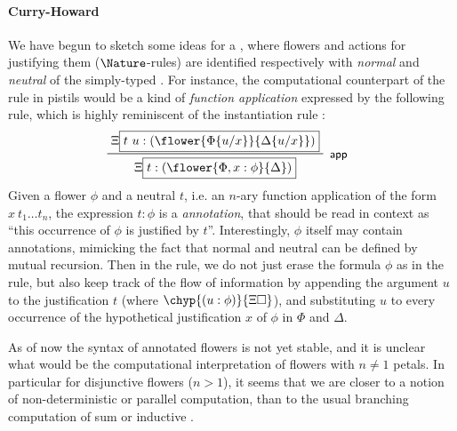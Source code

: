 \paragraph{Curry-Howard}

We have begun to sketch some ideas for a , where
flowers and \Proof actions for justifying them ($\Nature$-rules) are identified
respectively with \emph{normal} and \emph{neutral}  of the simply-typed
. For instance, the computational counterpart of the rule
 in pistils would be a kind of \emph{function application}
expressed by the following  rule, which is highly reminiscent of the
instantiation rule :
$$
\R[\rsf{app}]
  {\Xi\select{t~u : (\flower{\subst{\Phi}{u}{x}}{\subst{\Delta}{u}{x}})}}
  {\Xi\select{t : (\flower{\Phi, x : \phi}{\Delta})}}
$$
Given a flower $\phi$ and a neutral  $t$, i.e. an $n$-ary function
application of the form $x~t_1 \ldots t_n$, the expression $t : \phi$ is a
\emph{ annotation}, that should be read in context as ``this occurrence of
$\phi$ is justified by $t$''. Interestingly, $\phi$ itself may contain 
annotations, mimicking the fact that normal and neutral  can be defined by
mutual recursion. Then in the  rule, we do not just erase the formula
$\phi$ as in the  rule, but also keep track of the flow of
information by appending the argument $u$ to the justification $t$ (where
$\chyp{(u : \phi)}{\Xi\hole}$), and substituting $u$ to every occurrence of the
hypothetical justification $x$ of $\phi$ in $\Phi$ and $\Delta$.

As of now the syntax of annotated flowers is not yet stable, and it is unclear
what would be the computational interpretation of flowers with $n \not= 1$
petals. In particular for disjunctive flowers ($n > 1$), it seems that we are
closer to a notion of non-deterministic or parallel computation, than to the
usual branching computation of sum or inductive .

